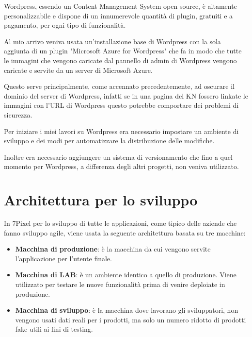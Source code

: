 


Wordpress, essendo un Content Management System open source, è altamente personalizzabile e dispone
di un innumerevole quantità di plugin, gratuiti e a pagamento, per ogni tipo di funzionalità.

Al mio arrivo veniva usata un'installazione base di Wordpress con la sola aggiunta di un plugin "Microsoft Azure 
for Wordpress" che fa in modo che tutte le immagini che vengono caricate dal pannello di admin di Wordpress
vengono caricate e servite da un server di Microsoft Azure.

Questo serve principalmente, come accennato precedentemente, ad oscurare il dominio del server di Wordpress,
infatti se in una pagina del KN fossero linkate le immagini con l'URL di Wordpress questo potrebbe 
comportare dei problemi di sicurezza.

Per iniziare i miei lavori su Wordpress era necessario impostare un ambiente di sviluppo e dei modi per automatizzare
la distribuzione delle modifiche.

Inoltre era necessario aggiungere un sistema di versionamento che fino a quel momento per Wordpress, a differenza
degli altri progetti, non veniva utilizzato.

\section{Architettura per lo sviluppo}

In 7Pixel per lo sviluppo di tutte le applicazioni, come tipico delle aziende che fanno sviluppo agile, viene usata la seguente architettura basata su tre macchine:
\begin{itemize}
\item {\bf Macchina di produzione}: è la macchina da cui vengono servite l'applicazione per l'utente finale.
\item {\bf Macchina di LAB}: è un ambiente identico a quello di produzione. Viene utilizzato per testare le nuove funzionalità
prima di venire deploiate in produzione.
\item {\bf Macchina di sviluppo}: è la macchina dove lavorano gli sviluppatori, non vengono usati dati reali per i prodotti, 
ma solo un numero ridotto di prodotti fake utili ai fini di testing.
\end{itemize}

